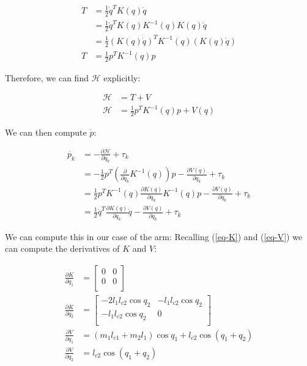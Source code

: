 \documentclass{article}
\begin{document}
\begin{align}
	T & = \frac 12 \dot{q}^T K(q) \dot{q} \nonumber \\
	& = \frac 12 \dot{q}^T K(q) K^{-1}(q) K(q) \dot{q} \nonumber \\
	& = \frac 12 \left( K(q) \dot{q} \right)^T K^{-1}(q) \left( K(q) \dot{q} \right) \nonumber \\
	T & = \frac 12 p^T K^{-1}(q) p \label{eq-T-from-p}
\end{align}

Therefore, we can find $\mathcal{H}$ explicitly:

\begin{align}
	\mathcal{H} & = T + V \nonumber \\
	\mathcal{H} & = \frac 12 p^T K^{-1}(q) p + V(q) \label{H-from-q-p}
\end{align}

We can then compute $\dot{p}$:

\begin{align}
\dot{p_k} & = - \frac {\partial \mathcal{H}}{\partial q_k} + \tau_k \nonumber \\
	& = - \frac 12 p^T \left( \frac {\partial}{\partial q_k} K^{-1}(q)  \right) p
		- \frac {\partial V(q)}{\partial q_k} + \tau_k \nonumber \\
	& = \frac 12 p^T K^{-1}(q) \frac {\partial K(q)}{\partial q_k}  K^{-1}(q) p
		- \frac {\partial V(q)}{\partial q_k} + \tau_k \label{eq-p-dot-here} \\
	& = \frac 12 \dot{q}^T \frac {\partial K(q)}{\partial q_k}  \dot{q}
		- \frac {\partial V(q)}{\partial q_k} + \tau_k \nonumber 
\end{align}

We can compute this in our case of the arm:
Recalling (\ref{eq-K}) and (\ref{eq-V}) we can compute the derivatives of $K$ and $V$:

\begin{align}
\frac {\partial K}{\partial q_1} & = \left[ \begin{matrix}
	0 & 0 \\
	0 & 0 \\
	\end{matrix} \right] \label{eq-dKdq1} \\
\frac {\partial K}{\partial q_2} & = \left[ \begin{matrix}
	- 2 l_1 l_{c2} \cos q_2 & - l_1 l_{c2} \cos q_2  \\
	- l_1 l_{c2} \cos q_2  & 0 \\
	\end{matrix} \right] \label{eq-dKdq2} \\
\frac {\partial V}{\partial q_1} & = 
	(m_1 l_{c1} + m_2 l_1) \cos q_1 + l_{c2} \cos (q_1 + q_2) \label{eq-dVdq1} \\
\frac {\partial V}{\partial q_2} & = 
	l_{c2} \cos (q_1 + q_2) \label{eq-dVdq1}
\end{align}
\end{document}
